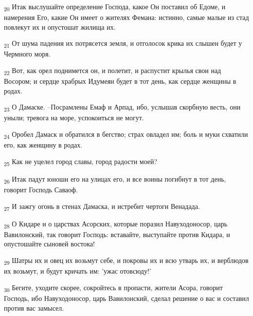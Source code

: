 \begin{tcolorbox}
\textsubscript{20} Итак выслушайте определение Господа, какое Он поставил об Едоме, и намерения Его, какие Он имеет о жителях Фемана: истинно, самые малые из стад повлекут их и опустошат жилища их.
\end{tcolorbox}
\begin{tcolorbox}
\textsubscript{21} От шума падения их потрясется земля, и отголосок крика их слышен будет у Чермного моря.
\end{tcolorbox}
\begin{tcolorbox}
\textsubscript{22} Вот, как орел поднимется он, и полетит, и распустит крылья свои над Восором; и сердце храбрых Идумеян будет в тот день, как сердце женщины в родах.
\end{tcolorbox}
\begin{tcolorbox}
\textsubscript{23} О Дамаске. --Посрамлены Емаф и Арпад, ибо, услышав скорбную весть, они уныли; тревога на море, успокоиться не могут.
\end{tcolorbox}
\begin{tcolorbox}
\textsubscript{24} Оробел Дамаск и обратился в бегство; страх овладел им; боль и муки схватили его, как женщину в родах.
\end{tcolorbox}
\begin{tcolorbox}
\textsubscript{25} Как не уцелел город славы, город радости моей?
\end{tcolorbox}
\begin{tcolorbox}
\textsubscript{26} Итак падут юноши его на улицах его, и все воины погибнут в тот день, говорит Господь Саваоф.
\end{tcolorbox}
\begin{tcolorbox}
\textsubscript{27} И зажгу огонь в стенах Дамаска, и истребит чертоги Венадада.
\end{tcolorbox}
\begin{tcolorbox}
\textsubscript{28} О Кидаре и о царствах Асорских, которые поразил Навуходоносор, царь Вавилонский, так говорит Господь: вставайте, выступайте против Кидара, и опустошайте сыновей востока!
\end{tcolorbox}
\begin{tcolorbox}
\textsubscript{29} Шатры их и овец их возьмут себе, и покровы их и всю утварь их, и верблюдов их возьмут, и будут кричать им: 'ужас отовсюду!'
\end{tcolorbox}
\begin{tcolorbox}
\textsubscript{30} Бегите, уходите скорее, сокройтесь в пропасти, жители Асора, говорит Господь, ибо Навуходоносор, царь Вавилонский, сделал решение о вас и составил против вас замысел.
\end{tcolorbox}
